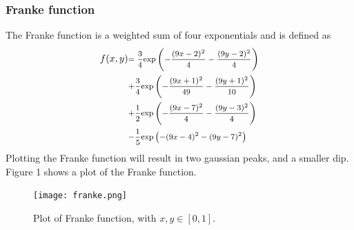 \documentclass[a4paper,twocolumn]{article}
\begin{document}
\subsubsection{Franke function}
The Franke function is a weighted sum of four exponentials and is defined as
\begin{align*}
    \tiny
    f(x,y) &\text{\footnotesize$=  \frac{3}{4}\textrm{exp}\left(-\frac{(9x-2)^{2}}{4}-\frac{(9y-2)^{2}}{4}\right)$}\\ 
    &\text{\footnotesize$+ \frac{3}{4}\textrm{exp}\left(-\frac{(9x+1)^{2}}{49}-\frac{(9y+1)^{2}}{10}\right)$}\\
    &\text{\footnotesize$+ \frac{1}{2}\textrm{exp}\left(-\frac{(9x-7)^{2}}{4}-\frac{(9y-3)^{2}}{4}\right)$}\\
    &\text{\footnotesize$- \frac{1}{5}\textrm{exp}\left(-(9x-4)^{2}-(9y-7)^{2}\right)$}
\end{align*}
Plotting the Franke function will result in two gaussian peaks, and a smaller dip. Figure 1 shows a plot of the Franke function.
\begin{figure}[ht]
    \centering
    \texttt{[image: franke.png]}
    \caption{Plot of Franke function, with $x,y \in [0,1]$.}
\end{figure}
\end{document}
